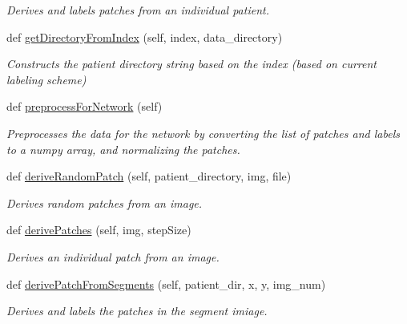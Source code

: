\begin{DoxyCompactItemize}
\begin{DoxyCompactList}\small\item\em Derives and labels patches from an individual patient. \end{DoxyCompactList}\item 
def \mbox{\hyperlink{classDataHandler_1_1DataHandler_afd589c1c68b4189c4ec6f7ff1d7dd81f}{get\+Directory\+From\+Index}} (self, index, data\+\_\+directory)
\begin{DoxyCompactList}\small\item\em Constructs the patient directory string based on the index (based on current labeling scheme) \end{DoxyCompactList}\item 
\mbox{\label{classDataHandler_1_1DataHandler_a51e4cac44cc8cab7e58279b54ffbad05}} 
def \mbox{\hyperlink{classDataHandler_1_1DataHandler_a51e4cac44cc8cab7e58279b54ffbad05}{preprocess\+For\+Network}} (self)
\begin{DoxyCompactList}\small\item\em Preprocesses the data for the network by converting the list of patches and labels to a numpy array, and normalizing the patches. \end{DoxyCompactList}\item 
def \mbox{\hyperlink{classDataHandler_1_1DataHandler_ac0052a0b42d5daf65187ccbeed8b8554}{derive\+Random\+Patch}} (self, patient\+\_\+directory, img, file)
\begin{DoxyCompactList}\small\item\em Derives random patches from an image. \end{DoxyCompactList}\item 
def \mbox{\hyperlink{classDataHandler_1_1DataHandler_a4ce184a87ec5b166dfbcfa250271de4b}{derive\+Patches}} (self, img, step\+Size)
\begin{DoxyCompactList}\small\item\em Derives an individual patch from an image. \end{DoxyCompactList}\item 
def \mbox{\hyperlink{classDataHandler_1_1DataHandler_aba20b63c301b50a420e9c57e3ba8964d}{derive\+Patch\+From\+Segments}} (self, patient\+\_\+dir, x, y, img\+\_\+num)
\begin{DoxyCompactList}\small\item\em Derives and labels the patches in the segment imiage. \end{DoxyCompactList}\item 

\end{DoxyCompactItemize}
